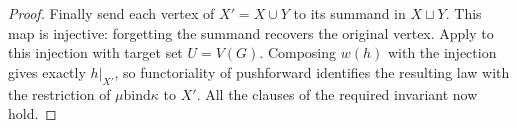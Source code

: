 \begin{proof}
Finally send each vertex of $X'=X\cup Y$ to its summand in
$X\sqcup Y$. This map is injective: forgetting the summand recovers
the original vertex. Apply  to this
injection with target set $U=V(G)$. Composing $w(h)$ with the injection
gives exactly $h|_{X'}$, so functoriality of pushforward identifies the
resulting law with the restriction of
$\mu\mathbin{\mathrm{bind}}\kappa$ to $X'$.
All the clauses of the required invariant now hold.
\end{proof}
